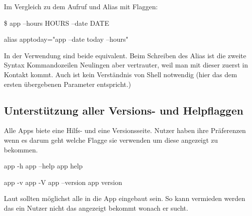 \documentclass[oneside,bibliography=totocnumbered,BCOR=5mm]{scrbook}
\newenvironment{code}{\captionsetup{type=listing, skip=0pt}}{}
\begin{document}
Im Vergleich zu dem Aufruf und Alias mit Flaggen:

\begin{code}
  \begin{shellcode}
\$ app --hours HOURS --date DATE

alias apptoday="app --date today --hours"
  \end{shellcode}
\end{code}

In der Verwendung sind beide equivalent. Beim Schreiben des Alias ist die zweite
Syntax Kommandozeilen Neulingen aber vertrauter, weil man mit dieser zuerst
in Kontakt kommt. Auch ist kein Verständnis von Shell notwendig (hier das
 dem ersten übergebenen Parameter entspricht.)

\subsection{Unterstützung aller Versions- und Helpflaggen}

Alle Apps biete eine Hilfs- und eine Versionsseite. Nutzer haben ihre Präferenzen
wenn es darum geht welche Flagge sie verwenden um diese angezeigt zu bekommen.

\begin{code}
  \begin{shellcode}
app -h
app --help
app help

app -v
app -V
app --version
app version
  \end{shellcode}
  \medskip
\end{code}

Laut \cite{12factor} sollten möglichst alle in die App eingebaut sein. So kann
vermieden werden das ein Nutzer nicht das angezeigt bekommt wonach er sucht.

\medskip


\bigskip %
\end{document}
